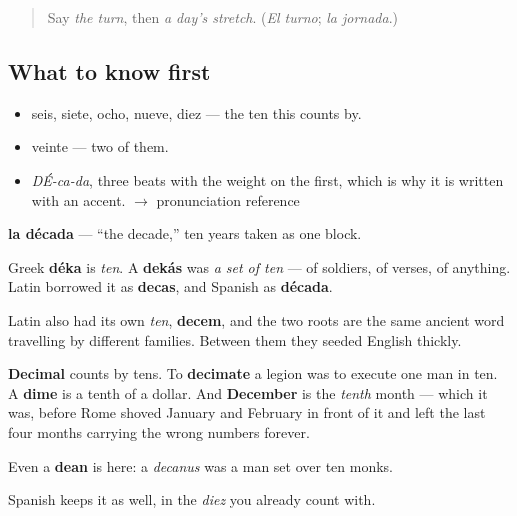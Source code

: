 \label{lesson:ES-C349-decada}



\begin{quote}
Say \emph{the turn}, then \emph{a day's stretch}. (\emph{El turno}; \emph{la jornada}.)
\end{quote}

\subsection*{What to know first}
\begin{itemize}
\raggedright
  \item seis, siete, ocho, nueve, diez — the ten this counts by.
  \item veinte — two of them.
\end{itemize}

\begin{sounds}
\begin{itemize}
\raggedright
  \item \emph{DÉ-ca-da}, three beats with the weight on the first, which is why it is written with an accent. $\to$ pronunciation reference
\end{itemize}
\end{sounds}

\begin{cousinweb}
\textbf{la década} — \textquotedblleft{}the decade,\textquotedblright{} ten years taken as one block.

Greek \textbf{déka} is \emph{ten}. A \textbf{dekás} was \emph{a set of ten} — of soldiers, of verses, of anything. Latin borrowed it as \textbf{decas}, and Spanish as \textbf{década}.

Latin also had its own \emph{ten}, \textbf{decem}, and the two roots are the same ancient word travelling by different families. Between them they seeded English thickly.

\textbf{Decimal} counts by tens. To \textbf{decimate} a legion was to execute one man in ten. A \textbf{dime} is a tenth of a dollar. And \textbf{December} is the \emph{tenth} month — which it was, before Rome shoved January and February in front of it and left the last four months carrying the wrong numbers forever.

Even a \textbf{dean} is here: a \emph{decanus} was a man set over ten monks.

Spanish keeps it as well, in the \emph{diez} you already count with.
\end{cousinweb}

